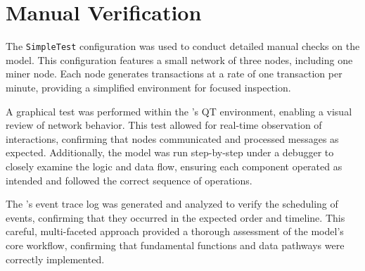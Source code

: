 \section{Manual Verification}\label{sec:manual-verification}

The \texttt{SimpleTest} configuration was used to conduct detailed manual
checks on the model. This configuration features a small network of three
nodes, including one miner node. Each node generates transactions at a rate of
one transaction per minute, providing a simplified environment for focused
inspection.

A graphical test was performed within the \omnetpp{}'s QT environment, enabling
a visual review of network behavior. This test allowed for real-time
observation of interactions, confirming that nodes communicated and processed
messages as expected. Additionally, the model was run step-by-step under a
debugger to closely examine the logic and data flow, ensuring each component
operated as intended and followed the correct sequence of operations.

The \omnetpp's event trace log was generated and analyzed to verify the
scheduling of events, confirming that they occurred in the expected order and
timeline. This careful, multi-faceted approach provided a thorough assessment
of the model's core workflow, confirming that fundamental functions and data
pathways were correctly implemented.
